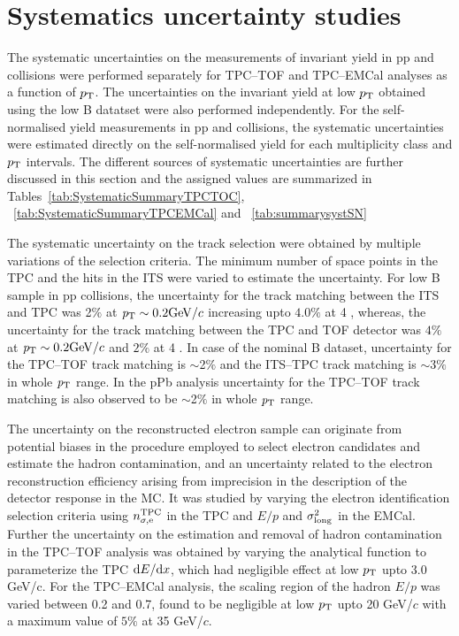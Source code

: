 \section{Systematics uncertainty studies}\label{sec:systematics}
The systematic uncertainties on the measurements of invariant yield in pp and \pPb collisions were performed separately for TPC--TOF and TPC--EMCal analyses as a function of $p_{\rm{T}}$. The uncertainties on the invariant yield at low $p_{\rm{T}}$ obtained using the low B datatset were also performed independently. For the self-normalised yield measurements in pp and \pPb collisions, the systematic uncertainties were estimated directly on the self-normalised yield for each multiplicity class and $p_{\rm{T}}$ intervals. The different sources of systematic uncertainties are further discussed in this section and the assigned values are summarized in Tables~\ref{tab:SystematicSummaryTPCTOC}, ~\ref{tab:SystematicSummaryTPCEMCal} and ~\ref{tab:summarysystSN}

The systematic uncertainty on the track selection were obtained by multiple variations of the selection criteria.  The minimum number of space points in the TPC and the hits in the ITS were varied to estimate the uncertainty. For low B sample in pp collisions, the uncertainty for the track matching between the ITS and TPC was 2$\%$ at ${\it p}_{\rm T} \sim 0.2 {\rm GeV/}c$ increasing upto $4.0\%$ at 4 \GeVc, whereas, the uncertainty for the track matching between the TPC and TOF detector was $4\%$ at ${\it p}_{\rm T} \sim 0.2 {\rm GeV/}c$ and $2\%$ at 4 \GeVc. In case of the nominal B dataset, uncertainty for the TPC--TOF track matching is  $\sim$2$\%$  and the ITS--TPC track matching is $\sim$3$\%$ in whole ${\it p}_{\rm T}$ range. In the pPb analysis uncertainty for the TPC--TOF track matching is also observed to be  $\sim$2$\%$ in whole ${\it p}_{\rm T}$ range.


The uncertainty on the reconstructed electron sample can originate from  potential biases in the procedure employed to select electron candidates and estimate the hadron contamination, and an uncertainty related to the electron reconstruction efficiency arising from imprecision in the description of the detector response in the MC. It was studied by varying the electron identification selection criteria using $n^{\rm{TPC}}_{\sigma,\rm{e}}$ in the TPC and $E/p$ and $\sigma^2_{\rm{long}}$ in the EMCal. Further the uncertainty on the estimation and removal of hadron contamination in the TPC--TOF analysis was obtained by varying the analytical function to parameterize the TPC ${\rm{d}}E/{{\rm{d}}x}$, which had negligible effect at low $p_{\rm{T}}$ upto 3.0 GeV/c. For the TPC--EMCal analysis, the scaling region of the hadron $E/p$ was varied between 0.2 and 0.7, found to be negligible at low $p_{\rm{T}}$ upto 20 GeV/$c$ with a maximum value of $5\%$ at 35 GeV/$c$.

